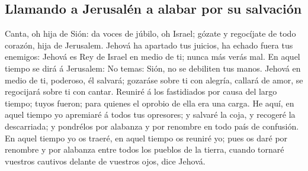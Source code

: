 \hypertarget{llamando-a-jerusaluxe9n-a-alabar-por-su-salvaciuxf3n}{%
\subsection{Llamando a Jerusalén a alabar por su
salvación}\label{llamando-a-jerusaluxe9n-a-alabar-por-su-salvaciuxf3n}}

 Canta, oh hija de Sión: da voces de júbilo, oh Israel;
gózate y regocíjate de todo corazón, hija de Jerusalem. 
Jehová ha apartado tus juicios, ha echado fuera tus enemigos: Jehová es
Rey de Israel en medio de ti; nunca más verás mal.  En
aquel tiempo se dirá á Jerusalem: No temas: Sión, no se debiliten tus
manos.  Jehová en medio de ti, poderoso, él salvará;
gozaráse sobre ti con alegría, callará de amor, se regocijará sobre ti
con cantar.  Reuniré á los fastidiados por causa del largo
tiempo; tuyos fueron; para quienes el oprobio de ella era una carga.
 He aquí, en aquel tiempo yo apremiaré á todos tus
opresores; y salvaré la coja, y recogeré la descarriada; y pondrélos por
alabanza y por renombre en todo país de confusión.  En
aquel tiempo yo os traeré, en aquel tiempo os reuniré yo; pues os daré
por renombre y por alabanza entre todos los pueblos de la tierra, cuando
tornaré vuestros cautivos delante de vuestros ojos, dice Jehová.
